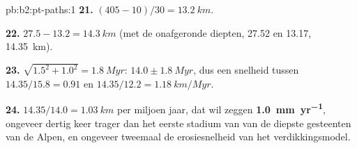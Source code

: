 \begin{solution}{pb:b2:pt-paths:1}
\textbf{21.} $(405 - 10)/30 = \qty{13.2}{km}$.

\textbf{22.} $27.5 - 13.2 = \qty{14.3}{km}$ (met de onafgeronde diepten, 27.52 en 13.17,
\qty{14.35}{km}).

\textbf{23.} $\sqrt{1.5^2 + 1.0^2} = \qty{1.8}{Myr}$: $14.0 \pm \qty{1.8}{Myr}$, dus een snelheid
tussen $14.35/15.8 = 0.91$ en $14.35/12.2 = \qty{1.18}{km/Myr}$.

\textbf{24.} $14.35/14.0 = \qty{1.03}{km}$ per miljoen jaar, dat wil zeggen
\textbf{\qty[text-series-to-math=true]{1.0}{mm.yr^{-1}}}, ongeveer dertig keer trager dan
het eerste stadium van  van de diepste gesteenten van de Alpen, en ongeveer tweemaal de erosiesnelheid
van het verdikkingsmodel.
\end{solution}
